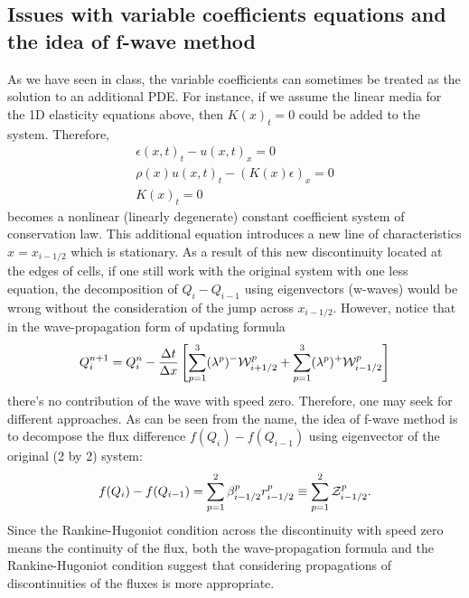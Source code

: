 \documentclass{article}
\begin{document}
\subsection{Issues with variable coefficients equations and the idea of f-wave method}
As we have seen in class, the variable coefficients can sometimes be treated as the solution to an additional PDE. For instance, if we assume the linear media for the 1D elasticity equations above, then $K(x)_t=0$ could be added to the system. Therefore,
\begin{align*}
\epsilon(x,t)_t-u(x,t)_x=0 \\
\rho(x) u(x,t)_t-(K(x)\epsilon)_x=0 \\
K(x)_t=0
\end{align*}
becomes a nonlinear (linearly degenerate) constant coefficient system of conservation law. This additional equation introduces a new line of characteristics $x=x_{i-1/2}$ which is stationary. As a result of this new discontinuity located at the edges of cells, if one still work with the original system with one less equation, the decomposition of $Q_i-Q_{i-1}$ using eigenvectors (w-waves) would be wrong without the consideration of the jump across $x_{i-1/2}$. However, notice that in the wave-propagation form of updating formula
\begin{align}
Q_i^{n+1}=Q_i^{n}-\frac{\Delta t}{\Delta x}\left[\sum_{p=1}^{3} (\lambda^p)^-{\cal W}_{i+1/2}^p+\sum_{p=1}^{3} (\lambda^p)^+ {\cal W}_{i-1/2}^p\right]
\end{align}
there's no contribution of the wave with speed zero. Therefore, one may seek for different approaches. As can be seen from the name, the idea of f-wave method is to decompose the flux difference $f(Q_i)-f(Q_{i-1})$ using eigenvector of the original (2 by 2) system:
\begin{align}
f(Q_i)-f(Q_{i-1})=\sum_{p=1}^{2} \beta^p_{i-1/2} r^p_{i-1/2}\equiv \sum_{p=1}^{2} {\cal Z}^p_{i-1/2}.
\end{align}
Since the Rankine-Hugoniot condition across the discontinuity with speed zero means the continuity of the flux, both the wave-propagation formula and the Rankine-Hugoniot condition suggest that considering propagations of discontinuities of the fluxes is more appropriate.
\end{document}
